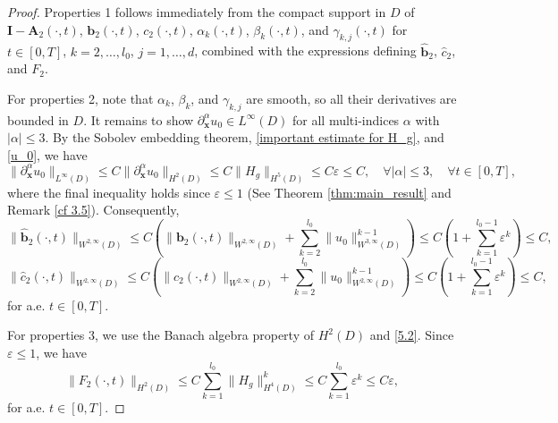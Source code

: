 \documentclass[10pt,a4paper]{amsart}
\begin{document}
	\begin{proof}
		Properties 1 follows immediately from the compact support in $D$ of $\mathbf{I} - \mathbf{A}_2(\cdot, t)$, $\mathbf{b}_2(\cdot, t)$, $c_2(\cdot, t)$, $\alpha_k(\cdot, t)$, $\beta_k(\cdot, t)$, and $\gamma_{k,j}(\cdot, t)$ for $t \in [0, T]$, $k = 2, \dots, l_0$, $j = 1, \dots, d$, combined with the expressions defining $\hat{\mathbf{b}}_2$, $\hat{c}_2$, and $F_2$.
		
		For properties 2, note that $\alpha_k$, $\beta_k$, and $\gamma_{k,j}$ are smooth, so all their derivatives are bounded in $D$. It remains to show $\partial_{\mathbf{x}}^{\alpha} u_0 \in L^{\infty}(D)$ for all multi-indices $\alpha$ with $|\alpha| \leqslant 3$. By the Sobolev embedding theorem, \eqref{important estimate for H_g}, and \eqref{u_0}, we have
		\begin{equation}\label{5.2}
			\|\partial_{\mathbf{x}}^{\alpha} u_0\|_{L^{\infty}(D)} \leqslant C \|\partial_{\mathbf{x}}^{\alpha} u_0\|_{H^{2}(D)} \leqslant C \|H_g\|_{H^5(D)} \leqslant C \varepsilon \leqslant C, \quad \forall |\alpha| \leqslant 3, \quad \forall t \in [0, T],
		\end{equation}
		where the final inequality holds since $\varepsilon \leqslant 1$ (See Theorem \ref{thm:main_result} and Remark \ref{cf 3.5}). Consequently,
		\begin{equation*}
			\|\hat{\mathbf{b}}_2(\cdot, t)\|_{W^{2,\infty}(D)} \leqslant C \left( \|\mathbf{b}_2(\cdot, t)\|_{W^{2,\infty}(D)} + \sum_{k=2}^{l_0} \|u_0\|_{W^{3,\infty}(D)}^{k-1} \right) \leqslant C \left( 1 + \sum_{k=1}^{l_0-1} \varepsilon^{k} \right) \leqslant C,
		\end{equation*}
		\begin{equation*}
			\|\hat{c}_2(\cdot, t)\|_{W^{2,\infty}(D)}\leqslant  C \left( \|c_2(\cdot, t)\|_{W^{2,\infty}(D)} + \sum_{k=2}^{l_0} \|u_0\|_{W^{2,\infty}(D)}^{k-1} \right) \leqslant C \left( 1 + \sum_{k=1}^{l_0-1} \varepsilon^{k} \right) \leqslant C,
		\end{equation*}
		for a.e. $t \in [0, T]$.
		
		For properties 3, we use the Banach algebra property of $H^2(D)$ and \eqref{5.2}. Since $\varepsilon \leqslant 1$, we have
		\begin{equation}\label{F_2}
			\|F_2(\cdot, t)\|_{H^{2}(D)} \leqslant C \sum_{k=1}^{l_0} \|H_g\|_{H^4(D)}^k \leqslant C \sum_{k=1}^{l_0} \varepsilon^k \leqslant C \varepsilon,
		\end{equation}
		for a.e. $t \in [0, T]$. 
	\end{proof}
\end{document}
